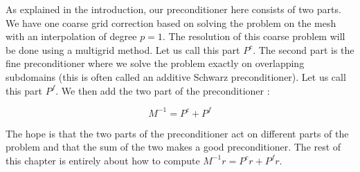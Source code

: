 As explained in the introduction, our preconditioner here consists of two parts. We have one coarse grid correction based on solving the problem on the mesh with an interpolation of degree $p=1$. The resolution of this coarse problem will be done using a multigrid method. Let us call this part $P^c$. The second part is the fine preconditioner where we solve the problem exactly on overlapping subdomains (this is often called an additive Schwarz preconditioner). Let us call this part $P^f$. We then add the two part of the preconditioner : 

$$ M^{-1} = P^c + P^f$$

The hope is that the two parts of the preconditioner act on different parts of the problem and that the sum of the two makes a good preconditioner. The rest of this chapter is entirely about how to compute $M^{-1}r = P^cr+P^fr$.

 

